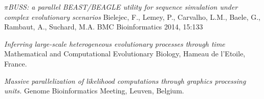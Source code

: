 \documentclass[a4paper, oneside, final]{scrartcl}
\newenvironment{lyxlist}[1]
{\begin{list}{}
{\settowidth{\labelwidth}{#1}
 \setlength{\leftmargin}{\labelwidth}
 \addtolength{\leftmargin}{\labelsep}
 \renewcommand{\makelabel}[1]{##1\hfil}}}
{\end{list}}
\newcommand{\noun}[1]{\textsc{#1}}
\begin{document}
\begin{center}
\begin{lyxlist}{00.00.0000}

\item [{\noun{\scriptsize 2013}}] \emph{$\pi$BUSS: a parallel BEAST/BEAGLE utility for sequence simulation under complex evolutionary scenarios} 
Bielejec, F., Lemey, P., Carvalho, L.M., Baele, G., Rambaut, A., Suchard, M.A.
BMC Bioinformatics 2014, 15:133  

\item [{\noun{\scriptsize 2013}}] \emph{Inferring large-scale heterogeneous evolutionary processes through time} 
Mathematical and Computational Evolutionary Biology, Hameau de l'Etoile, France.



\item [{\noun{\scriptsize 2012}}] \emph{Massive parallelization of likelihood computations through graphics processing units.} 
Genome Bioinformatics Meeting, Leuven, Belgium.





\end{lyxlist}
\end{center}
\end{document}
